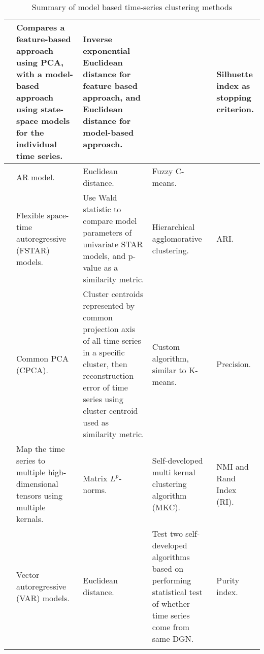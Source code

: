 \begin{longtable}{p{}p{}p{}p{}p{}}
    \cite{load_tsc_state_space_model}       & Compares a feature-based approach using PCA, with a model-based approach using state-space models for the individual time series.& Inverse exponential Euclidean distance for feature based approach, and Euclidean distance for model-based approach.& & Silhuette index as stopping criterion.\\ \hline
    \cite{struct_damage_ar_fuzzy_c_means}   & AR model.& Euclidean distance.& Fuzzy C-means.& \\ \hline
    \cite{fstar_hac_tsc}                    & Flexible space-time autoregressive (FSTAR) models.& Use Wald statistic to compare model parameters of univariate STAR models, and p-value as a similarity metric.& Hierarchical agglomorative clustering.& ARI.\\ \hline
    \cite{multivariate_tsc_common_pca}      & Common PCA (CPCA).& Cluster centroids represented by common projection axis of all time series in a specific cluster, then reconstruction error of time series using cluster centroid used as similarity metric.& Custom algorithm, similar to K-means.& Precision.\\ \hline
    \cite{tensor_multi_elastic_kernel_tsc}  & Map the time series to multiple high-dimensional tensors using multiple kernals.& Matrix $L^p$-norms.& Self-developed multi kernal clustering algorithm (MKC).& NMI and Rand Index (RI).\\ \hline
    \cite{var_multivar_tsc}                 & Vector autoregressive (VAR) models.& Euclidean distance.& Test two self-developed algorithms based on performing statistical test of whether time series come from same DGN. & Purity index.\\ \hline
    \hline
    \caption{Summary of model based time-series clustering methods}
    \label{tab:machine_learning_wt_cm_summary}
\end{longtable}

